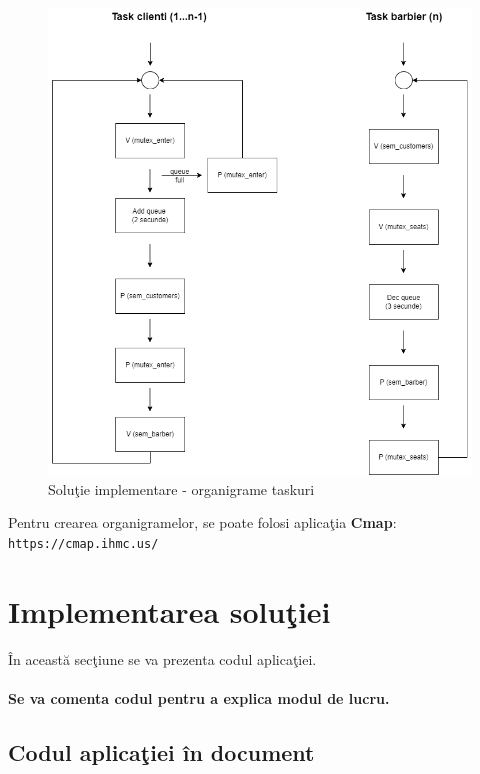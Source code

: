 \documentclass[a4paper, 11pt]{article}
\begin{document}
\begin{figure} [!htb]
\centering
\includegraphics[width=12cm]{./images/Organigrama.png}
\caption{\label{fig:taskuri}Solu\c{t}ie implementare - organigrame taskuri}
\end{figure} 

Pentru crearea organigramelor, se poate folosi aplica\c{t}ia \textbf{Cmap}: \texttt{https://cmap.ihmc.us/}


\section{Implementarea solu\c{t}iei}

\^{I}n aceast\u{a} sec\c{t}iune se va prezenta codul aplica\c{t}iei. 

\paragraph{Se va comenta codul pentru a explica modul de lucru.}

\subsection*{Codul aplica\c{t}iei \^{i}n document}

\medskip
\medskip
\end{document}
